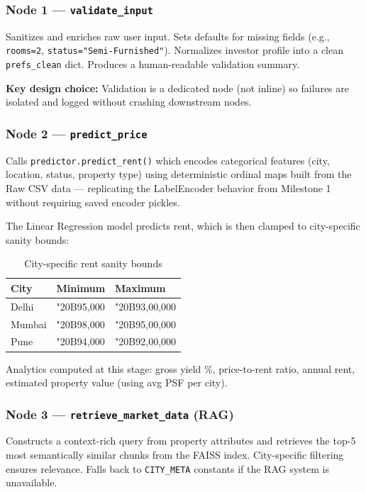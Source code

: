 \documentclass[12pt,a4paper]{article}
\newcommand{\code}[1]{\texttt{\small #1}}
\newcommand{\rupee}{{\fontencoding{T1}\selectfont\char"20B9}}
\begin{document}
\subsubsection{Node 1 --- \texttt{validate\_input}}

Sanitizes and enriches raw user input. Sets defaults for missing fields (e.g., \code{rooms=2}, \code{status="Semi-Furnished"}). Normalizes investor profile into a clean \code{prefs\_clean} dict. Produces a human-readable validation summary.

\textbf{Key design choice:} Validation is a dedicated node (not inline) so failures are isolated and logged without crashing downstream nodes.

\subsubsection{Node 2 --- \texttt{predict\_price}}

Calls \code{predictor.predict\_rent()} which encodes categorical features (city, location, status, property type) using deterministic ordinal maps built from the Raw CSV data --- replicating the LabelEncoder behavior from Milestone 1 without requiring saved encoder pickles.

The Linear Regression model predicts rent, which is then clamped to city-specific sanity bounds:

\begin{table}[H]
\centering
\caption{City-specific rent sanity bounds}
\begin{tabular}{lll}
\toprule
\textbf{City} & \textbf{Minimum} & \textbf{Maximum} \\
\midrule
Delhi  & \rupee 5{,}000  & \rupee 3{,}00{,}000 \\
Mumbai & \rupee 8{,}000  & \rupee 5{,}00{,}000 \\
Pune   & \rupee 4{,}000  & \rupee 2{,}00{,}000 \\
\bottomrule
\end{tabular}
\end{table}

Analytics computed at this stage: gross yield \%, price-to-rent ratio, annual rent, estimated property value (using avg PSF per city).

\subsubsection{Node 3 --- \texttt{retrieve\_market\_data} (RAG)}

Constructs a context-rich query from property attributes and retrieves the top-5 most semantically similar chunks from the FAISS index. City-specific filtering ensures relevance. Falls back to \code{CITY\_META} constants if the RAG system is unavailable.
\end{document}
